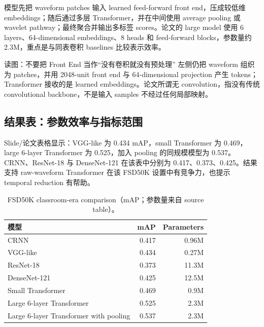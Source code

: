 模型先把 waveform patches 输入 learned feed-forward front end，压成较低维 embeddings；随后通过多层 Transformer，并在中间使用 average pooling 或 wavelet pathway；最终聚合并输出多标签 scores。论文的 large model 使用 6 layers、64-dimensional embeddings、8 heads 和 feed-forward blocks，参数量约 2.3M，重点是与同表卷积 baselines 比较表示效率。



\begin{knowledgebox}{读图：不要把 Front End 当作“没有卷积就没有预处理”}
左侧仍把 waveform 组织为 patches，并用 2048-unit front end 与 64-dimensional projection 产生 tokens；Transformer 接收的是 learned embeddings。论文所谓无 convolution，指没有传统 convolutional backbone，不是输入 samples 不经过任何局部映射。
\end{knowledgebox}

\subsection{结果表：参数效率与指标范围}

Slide/论文表格显示：VGG-like 为 0.434 mAP，small Transformer 为 0.469，large 6-layer Transformer 为 0.525，加入 pooling 的同规模模型为 0.537。CRNN、ResNet-18 与 DenseNet-121 在该表中分别为 0.417、0.373、0.425。结果支持 raw-waveform Transformer 在该 FSD50K 设置中有竞争力，也提示 temporal reduction 有帮助。


\begin{table}[H]
\centering
\small
\caption{FSD50K classroom-era comparison（mAP；参数量来自 source table）。}
\begin{tabular}{lrr}
\toprule
模型 & mAP & Parameters \\
\midrule
CRNN & 0.417 & 0.96M \\
VGG-like & 0.434 & 0.27M \\
ResNet-18 & 0.373 & 11.3M \\
DenseNet-121 & 0.425 & 12.5M \\
Small Transformer & 0.469 & 0.9M \\
Large 6-layer Transformer & 0.525 & 2.3M \\
Large 6-layer Transformer with pooling & 0.537 & 2.3M \\
\bottomrule
\end{tabular}
\end{table}

